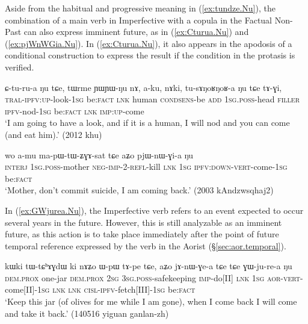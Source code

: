 Aside from the habitual and progressive meaning in (\ref{ex:tundze.Nu}), the  combination of a main verb in Imperfective with a copula in the Factual Non-Past can also express imminent future, as in (\ref{ex:Cturua.Nu}) and (\ref{ex:pjWnWGia.Nu}). In (\ref{ex:Cturua.Nu}), it also appears in the apodosis of a conditional construction to express the result if the condition in the protasis is verified.
\newpage
\begin{exe}
\ex \label{ex:Cturua.Nu}
\gll  ɕ-tu-ru-a ŋu tɕe, tɯrme ɲɯ\redp{}ɲɯ-ŋu nɤ, a-ku, nɤki, tu-sɤŋoʁŋoʁ-a ŋu tɕe tɤ-ɣi, \\
\textsc{tral}-\textsc{ipfv}:\textsc{up}-look-\textsc{1sg} be:\textsc{fact} \textsc{lnk} human \textsc{cond}\redp{}\textsc{sens}-be \textsc{add} \textsc{1sg}.\textsc{poss}-head \textsc{filler} \textsc{ipfv}-nod-\textsc{1sg} be:\textsc{fact} \textsc{lnk} \textsc{imp}:\textsc{up}-come \\
\glt `I am going to have a look, and if it is a human, I will nod and you can come (and eat him).' (2012 khu)
\end{exe}

\begin{exe}
\ex \label{ex:pjWnWGia.Nu}
\gll wo a-mu ma-pɯ-tɯ-ʑɣɤ-sat tɕe aʑo pjɯ-nɯ-ɣi-a ŋu \\
\textsc{interj} \textsc{1sg}.\textsc{poss}-mother \textsc{neg}-\textsc{imp}-2-\textsc{refl}-kill \textsc{lnk} \textsc{1sg} \textsc{ipfv}:\textsc{down}-\textsc{vert}-come-\textsc{1sg} be:\textsc{fact} \\
\glt `Mother, don't commit suicide, I am coming back.' (2003 kAndzwsqhaj2)
\end{exe}

In (\ref{ex:GWjurea.Nu}), the Imperfective verb  refers to an event expected to occur several years in the future. However, this is still analyzable as an imminent future, as this action is to take place immediately after the point of future temporal reference expressed by the verb  in the Aorist (§\ref{sec:aor.temporal}).

\begin{exe}
\ex \label{ex:GWjurea.Nu}
\gll  kɯki tɯ-tɕʰɤɣdɯ ki nɤʑo ɯ-pɯ tɤ-pe tɕe,  aʑo jɤ-nɯ-ɣe-a tɕe tɕe ɣɯ-ju-re-a ŋu\\
\textsc{dem}.\textsc{prox} one-jar \textsc{dem}.\textsc{prox} \textsc{2sg} \textsc{3sg}.\textsc{poss}-safekeeping \textsc{imp}-do[II] \textsc{lnk} \textsc{1sg} \textsc{aor}-\textsc{vert}-come[II]-\textsc{1sg} \textsc{lnk} \textsc{lnk} \textsc{cisl}-\textsc{ipfv}-fetch[III]-\textsc{1sg} be:\textsc{fact}\\
\glt `Keep this jar (of olives for me while I am gone), when I come back I will come and take it back.' (140516 yiguan ganlan-zh)
\end{exe}

